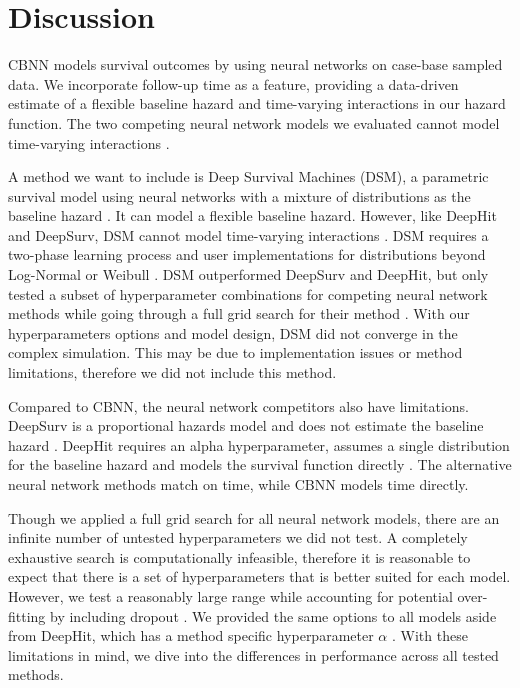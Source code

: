 \documentclass[APA,LATO1COL]{WileyNJD-v2}
\begin{document}
\hypertarget{discussion}{%
\section{Discussion}\label{discussion}}

CBNN models survival outcomes by using neural networks on case-base
sampled data. We incorporate follow-up time as a feature, providing a
data-driven estimate of a flexible baseline hazard and time-varying
interactions in our hazard function. The two competing neural network
models we evaluated cannot model time-varying interactions
 \citep{katzman2018DeepSurv} \citep{lee2018DeepHit}.
 
A method we want to include is Deep Survival Machines (DSM), a
parametric survival model using neural networks with a mixture of
distributions as the baseline hazard \citep{dsmPaper}. It can model
a flexible baseline hazard. However, like DeepHit
and DeepSurv, DSM cannot model time-varying interactions \citep{dsmPaper}. DSM
requires a two-phase learning process and user implementations for
distributions beyond Log-Normal or Weibull
\citep{dsmPaper}. DSM outperformed DeepSurv and DeepHit, but only tested
a subset of hyperparameter combinations for competing neural network methods
while going through a full grid search for their method \citep{dsmPaper}.
With our hyperparameters options and model design, DSM did not
converge in the complex simulation. This may be due to implementation issues or
method limitations, therefore we did not include this method.

Compared to CBNN, the neural network competitors also have limitations.
DeepSurv is a proportional hazards model and does
not estimate the baseline hazard \citep{katzman2018DeepSurv}. DeepHit
requires an alpha hyperparameter, assumes a single distribution
for the baseline hazard and models the survival function directly
\citep{lee2018DeepHit}. The alternative neural network methods
match on time, while CBNN models time directly.

Though we applied a full grid search for all neural network models,
there are an infinite number of untested hyperparameters we did not
test. A completely exhaustive search is computationally infeasible,
therefore it is reasonable to expect that there is a set of hyperparameters
that is better suited for each model. However, we test a reasonably large
range while accounting for potential over-fitting by including dropout
\citep{gulli2017}. We provided the same options to all models aside from
DeepHit, which has a method specific hyperparameter $\alpha$
\citep{lee2018DeepHit}. With these limitations in mind, we dive
into the differences in performance across all tested methods.
\end{document}
